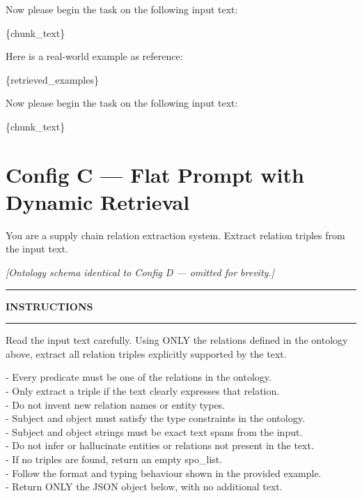 \begin{appendices}
\begin{tcolorbox}[userprompt, title=User Prompt]
\medskip
Now please begin the task on the following input text:

\medskip
\{chunk\_text\}
\end{tcolorbox}


\begin{tcolorbox}[userprompt, title=User Prompt]
Here is a real-world example as reference:

\medskip
\{retrieved\_examples\}

\medskip
Now please begin the task on the following input text:

\medskip
\{chunk\_text\}
\end{tcolorbox}


\section*{Config C — Flat Prompt with Dynamic Retrieval}

\begin{tcolorbox}[sysprompt, title=System Prompt]
You are a supply chain relation extraction system. Extract relation
triples from the input text.

\medskip
\textit{[Ontology schema identical to Config D — omitted for brevity.]}

\medskip
\hrule
\medskip
\textbf{INSTRUCTIONS}
\medskip
\hrule

\medskip
Read the input text carefully. Using ONLY the relations defined in
the ontology above, extract all relation triples explicitly supported
by the text.

\smallskip
- Every predicate must be one of the relations in the ontology.\\
- Only extract a triple if the text clearly expresses that relation.\\
- Do not invent new relation names or entity types.\\
- Subject and object must satisfy the type constraints in the ontology.\\
- Subject and object strings must be exact text spans from the input.\\
- Do not infer or hallucinate entities or relations not present in the text.\\
- If no triples are found, return an empty spo\_list.\\
- Follow the format and typing behaviour shown in the provided example.\\
- Return ONLY the JSON object below, with no additional text.


\end{tcolorbox}
\end{appendices}
